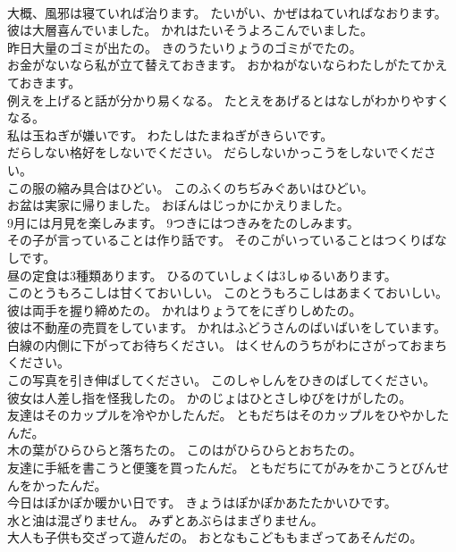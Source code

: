 \documentclass[8pt]{extreport}
\begin{document}
\begin{CJK}{UTF8}{min}
\\	大概、風邪は寝ていれば治ります。	たいがい、かぜはねていればなおります。 
\\	彼は大層喜んでいました。	かれはたいそうよろこんでいました。 
\\	昨日大量のゴミが出たの。	きのうたいりょうのゴミがでたの。 
\\	お金がないなら私が立て替えておきます。	おかねがないならわたしがたてかえておきます。 
\\	例えを上げると話が分かり易くなる。	たとえをあげるとはなしがわかりやすくなる。 
\\	私は玉ねぎが嫌いです。	わたしはたまねぎがきらいです。 
\\	だらしない格好をしないでください。	だらしないかっこうをしないでください。 
\\	この服の縮み具合はひどい。	このふくのちぢみぐあいはひどい。 
\\	お盆は実家に帰りました。	おぼんはじっかにかえりました。 
\\	9月には月見を楽しみます。	9つきにはつきみをたのしみます。 
\\	その子が言っていることは作り話です。	そのこがいっていることはつくりばなしです。 
\\	昼の定食は3種類あります。	ひるのていしょくは3しゅるいあります。 
\\	このとうもろこしは甘くておいしい。	このとうもろこしはあまくておいしい。 
\\	彼は両手を握り締めたの。	かれはりょうてをにぎりしめたの。 
\\	彼は不動産の売買をしています。	かれはふどうさんのばいばいをしています。 
\\	白線の内側に下がってお待ちください。	はくせんのうちがわにさがっておまちください。 
\\	この写真を引き伸ばしてください。	このしゃしんをひきのばしてください。 
\\	彼女は人差し指を怪我したの。	かのじょはひとさしゆびをけがしたの。 
\\	友達はそのカップルを冷やかしたんだ。	ともだちはそのカップルをひやかしたんだ。 
\\	木の葉がひらひらと落ちたの。	このはがひらひらとおちたの。 
\\	友達に手紙を書こうと便箋を買ったんだ。	ともだちにてがみをかこうとびんせんをかったんだ。 
\\	今日はぽかぽか暖かい日です。	きょうはぽかぽかあたたかいひです。 
\\	水と油は混ざりません。	みずとあぶらはまざりません。 
\\	大人も子供も交ざって遊んだの。	おとなもこどももまざってあそんだの。 

\end{CJK}
\end{document}
